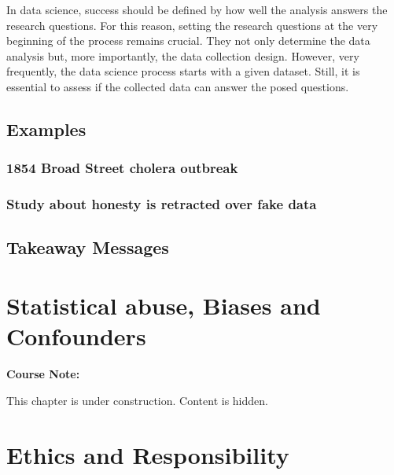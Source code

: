 \documentclass[
]{book}
\begin{document}
In data science, success should be defined by how well the analysis answers the research questions. For this reason, setting the research questions at the very beginning of the process remains crucial. They not only determine the data analysis but, more importantly, the data collection design. However, very frequently, the data science process starts with a given dataset. Still, it is essential to assess if the collected data can answer the posed questions.

\hypertarget{examples-2}{%
\section{Examples}\label{examples-2}}

\hypertarget{john-snow}{%
\subsection{1854 Broad Street cholera outbreak}\label{john-snow}}

\hypertarget{study-about-honesty-is-retracted-over-fake-data}{%
\subsection{Study about honesty is retracted over fake data}\label{study-about-honesty-is-retracted-over-fake-data}}

\hypertarget{takeaway-messages}{%
\section{Takeaway Messages}\label{takeaway-messages}}

\hypertarget{stats-abuse}{%
\chapter{Statistical abuse, Biases and Confounders}\label{stats-abuse}}

\begin{notebox}

\begin{center}
\textbf{Course Note:}

\end{center}

This chapter is under construction. Content is hidden.

\end{notebox}

\hypertarget{ethics-and-responsibility}{%
\chapter{Ethics and Responsibility}\label{ethics-and-responsibility}}
\end{document}

